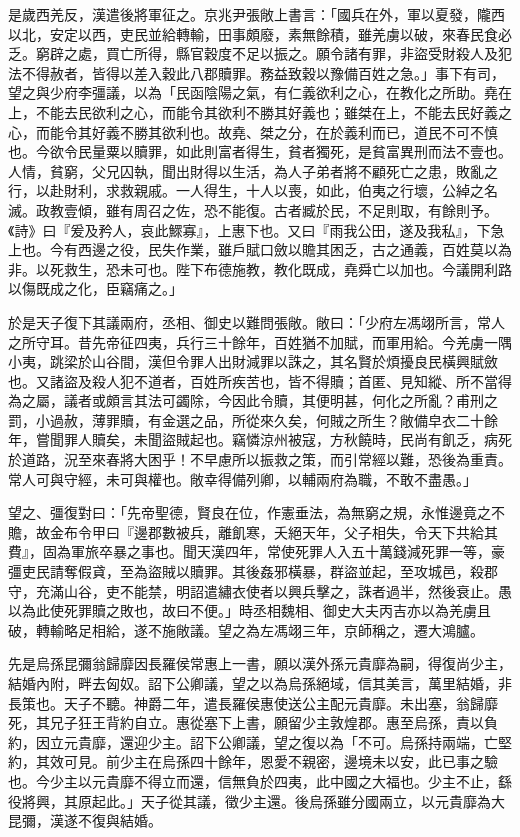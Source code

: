 \begin{pinyinscope}
是歲西羌反，漢遣後將軍征之。京兆尹張敞上書言：「國兵在外，軍以夏發，隴西以北，安定以西，吏民並給轉輸，田事頗廢，素無餘積，雖羌虜以破，來春民食必乏。窮辟之處，買亡所得，縣官穀度不足以振之。願令諸有罪，非盜受財殺人及犯法不得赦者，皆得以差入穀此八郡贖罪。務益致穀以豫備百姓之急。」事下有司，望之與少府李彊議，以為「民函陰陽之氣，有仁義欲利之心，在教化之所助。堯在上，不能去民欲利之心，而能令其欲利不勝其好義也；雖桀在上，不能去民好義之心，而能令其好義不勝其欲利也。故堯、桀之分，在於義利而已，道民不可不慎也。今欲令民量粟以贖罪，如此則富者得生，貧者獨死，是貧富異刑而法不壹也。人情，貧窮，父兄囚執，聞出財得以生活，為人子弟者將不顧死亡之患，敗亂之行，以赴財利，求救親戚。一人得生，十人以喪，如此，伯夷之行壞，公綽之名滅。政教壹傾，雖有周召之佐，恐不能復。古者臧於民，不足則取，有餘則予。《詩》曰『爰及矜人，哀此鰥寡』，上惠下也。又曰『雨我公田，遂及我私』，下急上也。今有西邊之役，民失作業，雖戶賦口斂以贍其困乏，古之通義，百姓莫以為非。以死救生，恐未可也。陛下布德施教，教化既成，堯舜亡以加也。今議開利路以傷既成之化，臣竊痛之。」

於是天子復下其議兩府，丞相、御史以難問張敞。敞曰：「少府左馮翊所言，常人之所守耳。昔先帝征四夷，兵行三十餘年，百姓猶不加賦，而軍用給。今羌虜一隅小夷，跳梁於山谷間，漢但令罪人出財減罪以誅之，其名賢於煩擾良民橫興賦斂也。又諸盜及殺人犯不道者，百姓所疾苦也，皆不得贖；首匿、見知縱、所不當得為之屬，議者或頗言其法可蠲除，今因此令贖，其便明甚，何化之所亂？甫刑之罰，小過赦，薄罪贖，有金選之品，所從來久矣，何賊之所生？敞備皁衣二十餘年，嘗聞罪人贖矣，未聞盜賊起也。竊憐涼州被寇，方秋饒時，民尚有飢乏，病死於道路，況至來春將大困乎！不早慮所以振救之策，而引常經以難，恐後為重責。常人可與守經，未可與權也。敞幸得備列卿，以輔兩府為職，不敢不盡愚。」

望之、彊復對曰：「先帝聖德，賢良在位，作憲垂法，為無窮之規，永惟邊竟之不贍，故金布令甲曰『邊郡數被兵，離飢寒，夭絕天年，父子相失，令天下共給其費』，固為軍旅卒暴之事也。聞天漢四年，常使死罪人入五十萬錢減死罪一等，豪彊吏民請奪假貣，至為盜賊以贖罪。其後姦邪橫暴，群盜並起，至攻城邑，殺郡守，充滿山谷，吏不能禁，明詔遣繡衣使者以興兵擊之，誅者過半，然後衰止。愚以為此使死罪贖之敗也，故曰不便。」時丞相魏相、御史大夫丙吉亦以為羌虜且破，轉輸略足相給，遂不施敞議。望之為左馮翊三年，京師稱之，遷大鴻臚。

先是烏孫昆彌翁歸靡因長羅侯常惠上一書，願以漢外孫元貴靡為嗣，得復尚少主，結婚內附，畔去匈奴。詔下公卿議，望之以為烏孫絕域，信其美言，萬里結婚，非長策也。天子不聽。神爵二年，遣長羅侯惠使送公主配元貴靡。未出塞，翁歸靡死，其兄子狂王背約自立。惠從塞下上書，願留少主敦煌郡。惠至烏孫，責以負約，因立元貴靡，還迎少主。詔下公卿議，望之復以為「不可。烏孫持兩端，亡堅約，其效可見。前少主在烏孫四十餘年，恩愛不親密，邊境未以安，此已事之驗也。今少主以元貴靡不得立而還，信無負於四夷，此中國之大福也。少主不止，繇役將興，其原起此。」天子從其議，徵少主還。後烏孫雖分國兩立，以元貴靡為大昆彌，漢遂不復與結婚。


\end{pinyinscope}
